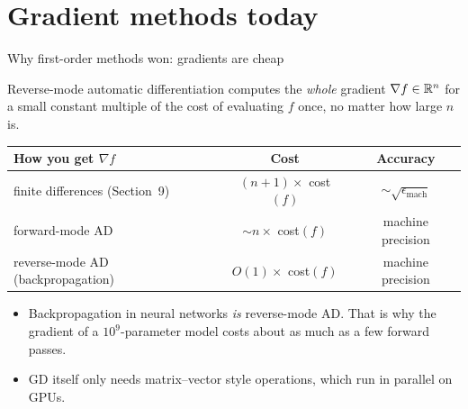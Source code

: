 \section{Gradient methods today}

\begin{frame}{Why first-order methods won: gradients are cheap}
  \begin{thmbox}
    Reverse-mode automatic differentiation computes the \emph{whole} gradient $\nabla f\in\mathbb{R}^n$ for a small constant
    multiple of the cost of evaluating $f$ once, \alert{no matter how large $n$ is}.
  \end{thmbox}
  \vspace{2pt}
  \centering\small
  \begin{tabular}{@{}l c c@{}}
    \toprule
    How you get $\nabla f$ & Cost & Accuracy \\
    \midrule
    finite differences (Section~9) & $(n+1)\times$ cost$(f)$ & $\sim\sqrt{\epsilon_{\text{mach}}}$ \\
    forward-mode AD & $\sim n\times$ cost$(f)$ & machine precision \\
    reverse-mode AD (backpropagation) & $O(1)\times$ cost$(f)$ & machine precision \\
    \bottomrule
  \end{tabular}

  \raggedright
  \begin{itemize}\footnotesize
    \item Backpropagation in neural networks \emph{is} reverse-mode AD. That is why the gradient of a $10^9$-parameter
          model costs about as much as a few forward passes.
    \item GD itself only needs matrix--vector style operations, which run in parallel on GPUs.
  \end{itemize}
\end{frame}

